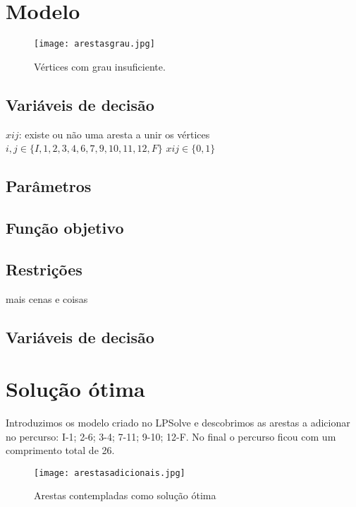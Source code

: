 \documentclass[runningheads]{llncs}
\begin{document}
    \newpage

    \section{Modelo}

    \begin{figure}[h]
        \centering
        \texttt{[image: arestasgrau.jpg]}
        \caption{Vértices com grau insuficiente.}
        \label{fig:data2}
    \end{figure}

    \subsection{Variáveis de decisão}


    $xij$: existe ou não uma aresta a unir os vértices $i,j \in \{I,1,2,3,4,6,7,9,10,11,12,F\}$
    \newline $xij \in \{0,1\}$

    \subsection{Parâmetros}

    \subsection{Função objetivo}

    \subsection{Restrições}
    mais cenas e coisas
    \subsection{Variáveis de decisão}

    \newpage

    \section{Solução ótima}
    Introduzimos os modelo criado no LPSolve e descobrimos as arestas a adicionar no
    percurso: I-1; 2-6; 3-4; 7-11; 9-10; 12-F. No final o percurso ficou com um comprimento total de 26.

    \begin{figure}[h]
        \centering
        \texttt{[image: arestasadicionais.jpg]}
        \caption{Arestas contempladas como solução ótima}
        \label{fig:data3}
    \end{figure}
\end{document}
